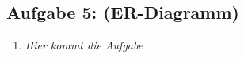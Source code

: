 \subsection{Aufgabe 5: (ER-Diagramm)}
\label{sec:Aufgabe5}
\begin{enumerate}[label=\alph*)]
    \item \textit{Hier kommt die Aufgabe}
\end{enumerate}